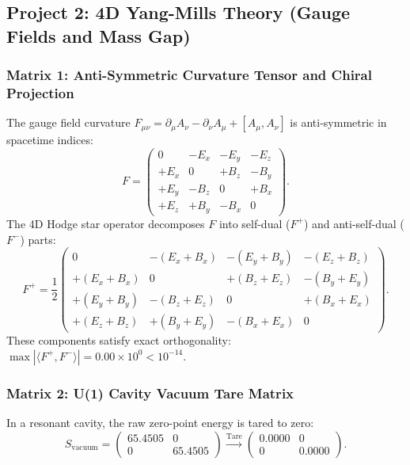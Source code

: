 \documentclass[11pt,a4paper]{article}
\begin{document}
\subsection{Project 2: 4D Yang-Mills Theory (Gauge Fields and Mass Gap)}

\subsubsection{Matrix 1: Anti-Symmetric Curvature Tensor and Chiral Projection}
The gauge field curvature $F_{\mu\nu} = \partial_\mu A_\nu - \partial_\nu A_\mu + [A_\mu, A_\nu]$ is anti-symmetric in spacetime indices:
\begin{equation}
F = \begin{pmatrix} 
0 & -E_x & -E_y & -E_z \\ 
+E_x & 0 & +B_z & -B_y \\ 
+E_y & -B_z & 0 & +B_x \\ 
+E_z & +B_y & -B_x & 0 
\end{pmatrix}.
\end{equation}
The 4D Hodge star operator decomposes $F$ into self-dual ($F^+$) and anti-self-dual ($F^-$) parts:
\begin{equation}
F^+ = \frac{1}{2}\begin{pmatrix} 
0 & -(E_x + B_x) & -(E_y + B_y) & -(E_z + B_z) \\ 
+(E_x + B_x) & 0 & +(B_z + E_z) & -(B_y + E_y) \\ 
+(E_y + B_y) & -(B_z + E_z) & 0 & +(B_x + E_x) \\ 
+(E_z + B_z) & +(B_y + E_y) & -(B_x + E_x) & 0 
\end{pmatrix}.
\end{equation}
These components satisfy exact orthogonality: $\max |\langle F^+, F^-\rangle| = 0.00\times 10^0 < 10^{-14}$.

\subsubsection{Matrix 2: U(1) Cavity Vacuum Tare Matrix}
In a resonant cavity, the raw zero-point energy is tared to zero:
\begin{equation}
S_{\mathrm{vacuum}} = \begin{pmatrix} 65.4505 & 0 \\ 0 & 65.4505 \end{pmatrix} \xrightarrow{\text{Tare}} \begin{pmatrix} 0.0000 & 0 \\ 0 & 0.0000 \end{pmatrix}.
\end{equation}
\end{document}
